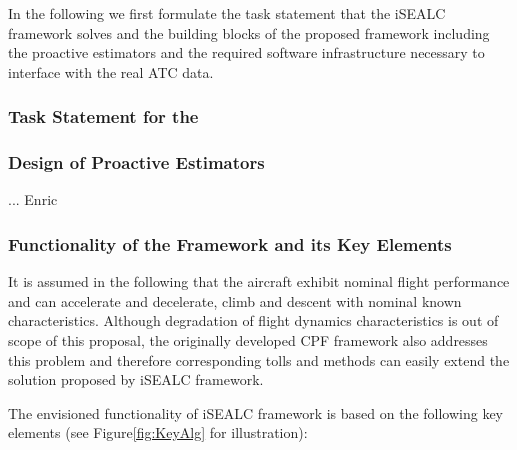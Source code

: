 \documentclass[letter,onecolumn,12pt]{aiaa-tc}
\newcommand{\1}{1_n}
\begin{document}
In the following we first formulate the task statement that the iSEALC framework solves and the building blocks of the proposed framework including the proactive estimators and the required software infrastructure necessary to interface with the real ATC data.



\subsubsection{Task Statement for the }

\subsubsection{Design of Proactive Estimators}
... Enric
\subsubsection{Functionality of the Framework and its Key Elements}
It is assumed in the following that the aircraft exhibit nominal flight performance and can accelerate and decelerate, climb and descent with nominal known characteristics.  Although degradation of flight dynamics characteristics is out of scope of this proposal, the originally developed CPF framework also addresses this problem and therefore corresponding tolls and methods can easily extend the solution proposed by iSEALC framework.

The envisioned functionality of iSEALC framework is based on the following key elements (see Figure\ref{fig:KeyAlg} for illustration):
%
\end{document}
